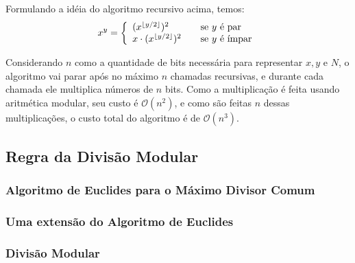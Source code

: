 Formulando a idéia do algoritmo recursivo acima, temos:
\[ x^y =
  \left \{
    \begin{array}{l l}
      (x^{\lfloor y/2 \rfloor})^2 & \quad \textrm{se $y$ é par}\\
      x\cdot(x^{\lfloor y/2 \rfloor})^2 & \quad \textrm{se $y$ é ímpar}
    \end{array}
  \right.
\]

Considerando $n$ como a quantidade de bits necessária para representar $x, y$
e $N$, o algoritmo vai parar após no máximo $n$ chamadas recursivas, e durante
cada chamada ele multiplica números de $n$ bits. Como a multiplicação é feita usando aritmética modular, 
seu custo é $\mathcal{O}(n^2)$, e como são feitas $n$ dessas multiplicações, o
custo total do algoritmo é de $\mathcal{O}(n^3)$.

\vspace{1.5em}
\subsection*{Regra da Divisão Modular}

\vspace{1.3em}
\subsubsection*{Algoritmo de Euclides para o Máximo Divisor Comum}

\vspace{1.3em}
\subsubsection*{Uma extensão do Algoritmo de Euclides}

\vspace{1.3em}
\subsubsection*{Divisão Modular}

